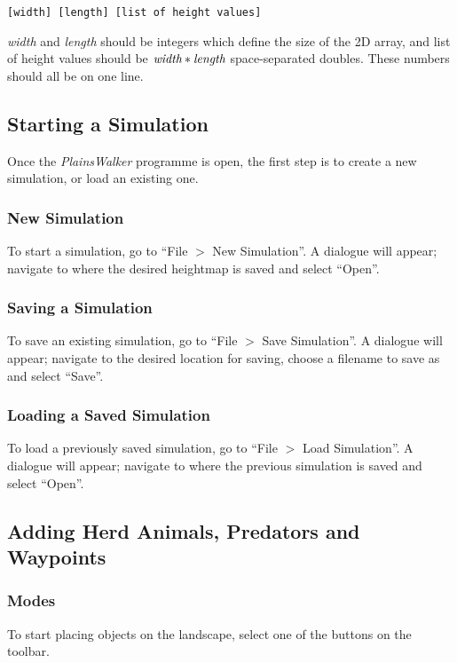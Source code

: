 \begin{verbatim}
[width] [length] [list of height values]
\end{verbatim}

\noindent \emph{width} and \emph{length} should be integers which define the size of the 2D array, and list of height values should be $\emph{width}*\emph{length}$ space-separated doubles. These numbers should all be on one line.

\subsection{Starting a Simulation}
Once the \emph{PlainsWalker} programme is open, the first step is to create a new simulation, or load an existing one.

\subsubsection{New Simulation}
To start a simulation, go to ``File $>$ New Simulation''. A dialogue will appear; navigate to where the desired heightmap is saved and select ``Open''.

\subsubsection{Saving a Simulation}
To save an existing simulation, go to ``File $>$ Save Simulation''. A dialogue will appear; navigate to the desired location for saving, choose a filename to save as and select ``Save''.

\subsubsection{Loading a Saved Simulation}
To load a previously saved simulation, go to ``File $>$ Load Simulation''. A dialogue will appear; navigate to where the previous simulation is saved and select ``Open''.

\subsection{Adding Herd Animals, Predators and Waypoints}
\subsubsection{Modes}
To start placing objects on the landscape, select one of the buttons on the toolbar.

\vspace{6 mm}

